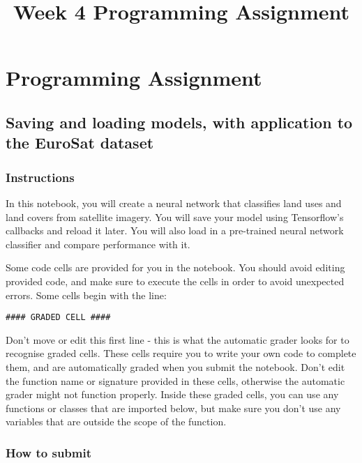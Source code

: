 \documentclass[11pt]{article}
\title{Week 4 Programming Assignment}
\begin{document}
    
    
    \maketitle
    
    

    
    \hypertarget{programming-assignment}{%
\section{Programming Assignment}\label{programming-assignment}}

\hypertarget{saving-and-loading-models-with-application-to-the-eurosat-dataset}{%
\subsection{Saving and loading models, with application to the EuroSat
dataset}\label{saving-and-loading-models-with-application-to-the-eurosat-dataset}}

\hypertarget{instructions}{%
\subsubsection{Instructions}\label{instructions}}

In this notebook, you will create a neural network that classifies land
uses and land covers from satellite imagery. You will save your model
using Tensorflow's callbacks and reload it later. You will also load in
a pre-trained neural network classifier and compare performance with it.

Some code cells are provided for you in the notebook. You should avoid
editing provided code, and make sure to execute the cells in order to
avoid unexpected errors. Some cells begin with the line:

\texttt{\#\#\#\#\ GRADED\ CELL\ \#\#\#\#}

Don't move or edit this first line - this is what the automatic grader
looks for to recognise graded cells. These cells require you to write
your own code to complete them, and are automatically graded when you
submit the notebook. Don't edit the function name or signature provided
in these cells, otherwise the automatic grader might not function
properly. Inside these graded cells, you can use any functions or
classes that are imported below, but make sure you don't use any
variables that are outside the scope of the function.

\hypertarget{how-to-submit}{%
\subsubsection{How to submit}\label{how-to-submit}}
\end{document}
